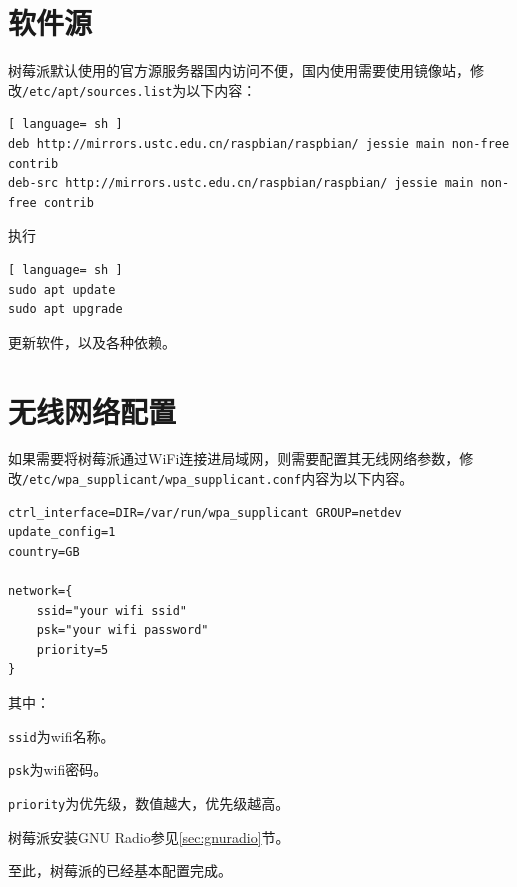 	\section{软件源}
		\par 树莓派默认使用的官方源服务器国内访问不便，国内使用需要使用镜像站，修改\lstinline[language=sh]{/etc/apt/sources.list}为以下内容：
		\begin{lstlisting}[ language= sh ]
deb http://mirrors.ustc.edu.cn/raspbian/raspbian/ jessie main non-free contrib 
deb-src http://mirrors.ustc.edu.cn/raspbian/raspbian/ jessie main non-free contrib
		\end{lstlisting}
		\par 执行
		\begin{lstlisting}[ language= sh ]
sudo apt update
sudo apt upgrade
		\end{lstlisting}
		\par 更新软件，以及各种依赖。
	\section{无线网络配置}
		\par 如果需要将树莓派通过WiFi连接进局域网，则需要配置其无线网络参数，修改\lstinline[language=sh]{/etc/wpa_supplicant/wpa_supplicant.conf}内容为以下内容。
		\begin{lstlisting}
ctrl_interface=DIR=/var/run/wpa_supplicant GROUP=netdev
update_config=1
country=GB

network={
	ssid="your wifi ssid"
	psk="your wifi password"
	priority=5
}
		\end{lstlisting}
		\par 其中：
		\par \lstinline{ssid}为wifi名称。
		\par \lstinline{psk}为wifi密码。
		\par \lstinline{priority}为优先级，数值越大，优先级越高。
		\par 树莓派安装GNU Radio参见\ref{sec:gnuradio}节。
		\par 至此，树莓派的已经基本配置完成。
